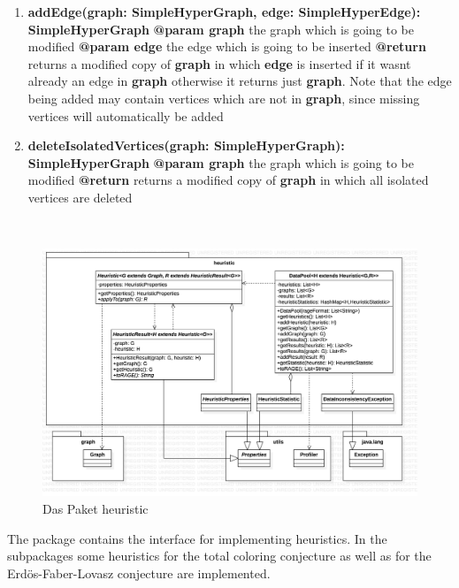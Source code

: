 \begin{enumerate}[+]
		\item{
			\textbf{addEdge(graph: SimpleHyperGraph, edge: SimpleHyperEdge): SimpleHyperGraph} \newline
			\textbf{@param graph} the graph which is going to be modified \newline
			\textbf{@param edge} the edge which is going to be inserted \newline
			\textbf{@return} returns a modified copy of \textbf{graph} in which \textbf{edge} is inserted if it wasnt already an edge in \textbf{graph} otherwise it returns just \textbf{graph}. Note that the edge being added may contain vertices which are not in \textbf{graph}, since missing vertices will automatically be added
		}
		\item{
			\textbf{deleteIsolatedVertices(graph: SimpleHyperGraph): SimpleHyperGraph} \newline
			\textbf{@param graph} the graph which is going to be modified \newline
			\textbf{@return} returns a modified copy of \textbf{graph} in which all isolated vertices are deleted		}
	\end{enumerate}
	
	~\newpage
	
	
	\begin{figure}
	\centering
\includegraphics[width=\textwidth]{abbildungen/heuristic.png}

	\caption{Das Paket heuristic }
	\label{img:heuristik}
\end{figure}
	
	The package contains the interface for implementing heuristics. In the subpackages some heuristics for the total coloring conjecture as well as for the Erdös-Faber-Lovasz conjecture are implemented.
	

